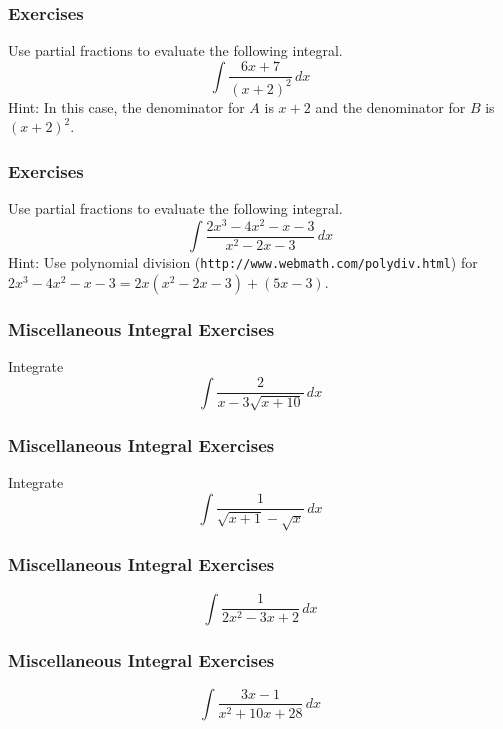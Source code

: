 \documentclass[xcolor=dvipsnames]{beamer}
\begin{document}
\begin{frame}
  \frametitle{Exercises}
  {\ubung} Use partial fractions to evaluate the following integral.
  \begin{equation}
    \label{eq:ietahpha}
    \int\frac{6x+7}{\left(x+2\right)^{2}}\,dx
  \end{equation}
  Hint: In this case, the denominator for $A$ is $x+2$ and the
  denominator for $B$ is $\left(x+2\right)^{2}$.
\end{frame}

\begin{frame}
  \frametitle{Exercises}
  {\ubung} Use partial fractions to evaluate the following integral.
  \begin{equation}
    \label{eq:saeheing}
    \int\frac{2x^{3}-4x^{2}-x-3}{x^{2}-2x-3}\,dx
  \end{equation}
  Hint: Use polynomial division (\texttt{http://www.webmath.com/polydiv.html}) for
  $2x^{3}-4x^{2}-x-3=2x(x^{2}-2x-3)+(5x-3)$.
\end{frame}

\begin{frame}
  \frametitle{Miscellaneous Integral Exercises}
  {\ubung} Integrate
  \begin{equation}
    \label{eq:haedeeli}
    \int\frac{2}{x-3\sqrt{x+10}}\,dx
  \end{equation}
\end{frame}

\begin{frame}
  \frametitle{Miscellaneous Integral Exercises}
  {\ubung} Integrate
  \begin{equation}
    \label{eq:oxeiyooh}
    \int\frac{1}{\sqrt{x+1}-\sqrt{x}}\,dx
  \end{equation}
\end{frame}

\begin{frame}
  \frametitle{Miscellaneous Integral Exercises}
  \begin{equation}
    \label{eq:oaruveep}
  \int\frac{1}{2x^{2}-3x+2}\,dx
\end{equation}
\end{frame}

\begin{frame}
  \frametitle{Miscellaneous Integral Exercises}
  \begin{equation}
    \label{eq:eefeishe}
  \int\frac{3x-1}{x^{2}+10x+28}\,dx
  \end{equation}
\end{frame}
\end{document}
